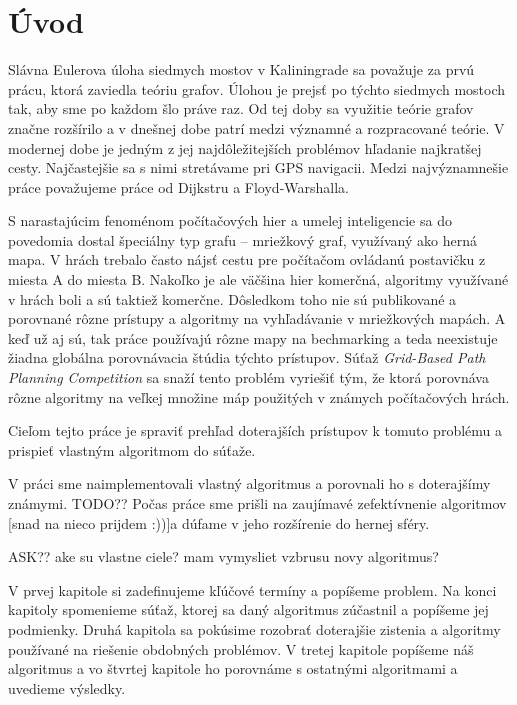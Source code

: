 \chapter*{Úvod}

Slávna Eulerova úloha siedmych mostov v Kaliningrade \cite{euler41} sa považuje za prvú prácu, 
ktorá zaviedla teóriu grafov. Úlohou je prejsť po týchto siedmych mostoch tak, aby sme po každom šlo práve raz.
Od tej doby sa využitie teórie grafov značne
rozšírilo a v dnešnej dobe patrí medzi významné
a rozpracované teórie. V modernej dobe je jedným z jej 
najdôležitejších problémov hľadanie najkratšej cesty. Najčastejšie sa s nimi stretávame pri 
GPS navigacii.
Medzi najvýznamnešie práce považujeme práce od Dijkstru \cite{dijkstra59} a Floyd-Warshalla.

S narastajúcim fenoménom počítačových hier 
a umelej inteligencie sa do povedomia dostal špeciálny typ grafu --
mriežkový graf, využívaný ako herná mapa.
V hrách trebalo často nájsť cestu pre počítačom
ovládanú postavičku z miesta A do miesta B.
Nakoľko je ale väčšina hier komerčná, algoritmy
využívané v hrách boli a sú taktiež komerčne.
Dôsledkom toho nie sú publikované a porovnané rôzne prístupy a algoritmy
na vyhľadávanie v mriežkových mapách. A keď už aj sú, tak práce používajú rôzne mapy
na bechmarking a teda neexistuje žiadna globálna porovnávacia štúdia týchto prístupov.
Súťaž {\sl Grid-Based Path Planning Competition}
 \cite{sturtevantgppc} sa snaží tento problém vyriešiť tým, že ktorá porovnáva rôzne algoritmy na veľkej množine máp
použitých v známych počítačových hrách.

Cieľom tejto práce je spraviť prehľad doterajších prístupov k tomuto problému a prispieť vlastným algoritmom
do súťaže.




V práci sme naimplementovali vlastný algoritmus a porovnali ho s doterajšímy známymi.
TODO?? Počas práce sme prišli na zaujímavé zefektívnenie algoritmov [snad na nieco prijdem :))]a dúfame v jeho rozšírenie do hernej sféry.

ASK?? ake su vlastne ciele? mam vymysliet vzbrusu novy algoritmus?

V prvej kapitole si zadefinujeme kľúčové termíny a popíšeme problem. Na konci kapitoly spomenieme súťaž, ktorej sa daný algoritmus zúčastnil 
a popíšeme jej podmienky.
Druhá kapitola sa pokúsime rozobrať doterajšie zistenia a algoritmy používané na riešenie obdobných problémov.
V tretej kapitole popíšeme náš algoritmus a vo štvrtej kapitole ho porovnáme s ostatnými algoritmami a uvedieme výsledky.
